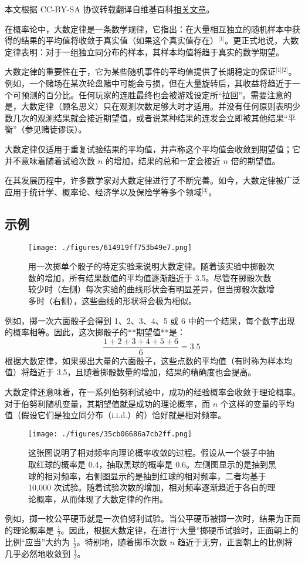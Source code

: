 
本文根据 CC-BY-SA 协议转载翻译自维基百科\href{https://en.wikipedia.org/wiki/Law_of_large_numbers}{相关文章}。

在概率论中，大数定律是一条数学规律，它指出：在大量相互独立的随机样本中获得的结果的平均值将收敛于真实值（如果这个真实值存在）\(^\text{[1]}\)。更正式地说，大数定律表明：对于一组独立同分布的样本，其样本均值将趋于真实的数学期望。

大数定律的重要性在于，它为某些随机事件的平均值提供了长期稳定的保证\(^\text{[1][2]}\)。例如，一个赌场在某次轮盘赌中可能会亏损，但在大量旋转后，其收益将趋近于一个可预测的百分比。任何玩家的连胜最终也会被游戏设定所“拉回”。需要注意的是，大数定律（顾名思义）只在观测次数足够大时才适用。并没有任何原则表明少数几次的观测结果就会接近期望值，或者说某种结果的连发会立即被其他结果“平衡”（参见赌徒谬误）。

大数定律仅适用于重复试验结果的平均值，并声称这个平均值会收敛到期望值；它并不意味着随着试验次数 $n$ 的增加，结果的总和一定会接近 $n$ 倍的期望值。

在其发展历程中，许多数学家对大数定律进行了不断完善。如今，大数定律被广泛应用于统计学、概率论、经济学以及保险学等多个领域\(^\text{[3]}\)。
\subsection{示例}
\begin{figure}[ht]
\centering
\texttt{[image: ./figures/614919ff753b49e7.png]}
\caption{用一次掷单个骰子的特定实验来说明大数定律。随着该实验中掷骰次数的增加，所有结果数值的平均值逐渐趋近于 3.5。尽管在掷骰次数较少时（左侧）每次实验的曲线形状会有明显差异，但当掷骰次数增多时（右侧），这些曲线的形状将会极为相似。} \label{fig_DSdl_1}
\end{figure}
例如，掷一次六面骰子会得到 1、2、3、4、5 或 6 中的一个结果，每个数字出现的概率相等。因此，这次掷骰子的**期望值**是：
$$
\frac{1 + 2 + 3 + 4 + 5 + 6}{6} = 3.5~
$$
根据大数定律，如果掷出大量的六面骰子，这些点数的平均值（有时称为样本均值）将趋近于 3.5，且随着掷骰数量的增加，结果的精确度也会提高。

大数定律还意味着，在一系列伯努利试验中，成功的经验概率会收敛于理论概率。对于伯努利随机变量，其期望值就是成功的理论概率，而 $n$ 个这样的变量的平均值（假设它们是独立同分布（i.i.d.）的）恰好就是相对频率。
\begin{figure}[ht]
\centering
\texttt{[image: ./figures/35cb06686a7cb2ff.png]}
\caption{这张图说明了相对频率向理论概率收敛的过程。假设从一个袋子中抽取红球的概率是 0.4，抽取黑球的概率是 0.6。左侧图显示的是抽到黑球的相对频率，右侧图显示的是抽到红球的相对频率，二者均基于 10,000 次试验。随着试验次数的增加，相对频率逐渐趋近于各自的理论概率，从而体现了大数定律的作用。} \label{fig_DSdl_2}
\end{figure}
例如，掷一枚公平硬币就是一次伯努利试验。当公平硬币被掷一次时，结果为正面的理论概率是 $\frac{1}{2}$。因此，根据大数定律，在进行“大量”掷硬币试验时，正面朝上的比例“应当”大约为 $\frac{1}{2}$。特别地，随着掷币次数 $n$ 趋近于无穷，正面朝上的比例将几乎必然地收敛到 $\frac{1}{2}$。

